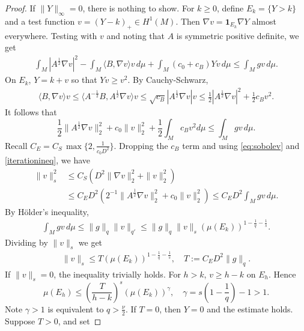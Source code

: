 \documentclass[11pt]{amsart}
\theoremstyle{definition}
\begin{document}
\begin{proof}
    If $\|Y\|_\infty=0$, there is nothing to show.  For $k\geq 0$, define $E_k=\{Y > k\}$ and a test function $v=(Y-k)_+\in H^1(M)$.  Then $\nabla v= \mathbf{1}_{E_k}\nabla Y$ almost everywhere.  Testing with $v$ and noting that $A$ is symmetric positive definite, we get
    \begin{align*}
        \int_M |A^{\frac{1}{2}}\nabla v|^2-\int_M\langle B,\nabla v\rangle v\,d\mu+\int_M(c_0+ c_B)Yv\,d\mu\leq \int_Mgv\,d\mu.
    \end{align*}
    On $E_k$, $Y=k+v$ so that $Yv\geq v^2$.  By Cauchy-Schwarz, 
    \begin{align*}
        \langle B,\nabla v\rangle v\leq \langle A^{-\frac{1}{2}}B,A^{\frac{1}{2}}\nabla v\rangle v\leq \sqrt{c_B}|A^{\frac{1}{2}}\nabla v|v\leq \frac{1}{2}|A^{\frac{1}{2}}\nabla v|^2+\frac{1}{2}c_Bv^2.
    \end{align*}
    It follows that
    \begin{equation}\label{iterationineq}
    \frac{1}{2}\|A^{\frac{1}{2}}\nabla v\|_2^2+c_0\|v\|_2^2+\frac{1}{2}\int_Mc_Bv^2d\mu\leq \int_Mgv\,d\mu.
    \end{equation}
    Recall $C_E=C_S\,\max\{2,\frac{1}{c_0D^2}\}$. Dropping the $c_B$ term and using \eqref{eq:sobolev} and \eqref{iterationineq}, we have
    \begin{align*}
        \|v\|_s^2&\leq C_S(D^2\|\nabla v\|_2^2+\|v\|_2^2)\\
        &\leq C_ED^2(2^{-1}\|A^{\frac{1}{2}}\nabla v\|_2^2+c_0\|v\|_2^2)\leq C_ED^2\int_Mgv\,d\mu.
    \end{align*}
    By H\"older's inequality,
    \begin{align*}
        \int_Mgv\,d\mu\leq\|g\|_q\|v\|_{q'}\leq\|g\|_q\|v\|_s(\mu(E_k))^{1-\frac{1}{q}-\frac{1}{s}}.
    \end{align*}
    Dividing by $\|v\|_s$ we get
    \begin{align*}
        \|v\|_s\leq T(\mu(E_k))^{1-\frac{1}{q}-\frac{1}{s}}, \quad T:=C_ED^2\|g\|_q.
    \end{align*}
    If $\|v\|_s=0$, the inequality trivially holds.
    For $h>k$, $v\geq h-k$ on $E_h$. Hence
    \begin{equation}\label{measureineq}
       \mu(E_h)\leq \left(\frac{T}{h-k}\right)^s(\mu(E_k))^\gamma, \quad \gamma=s\left(1-\frac{1}{q}\right)-1>1. 
    \end{equation}
    Note $\gamma>1$ is equivalent to $q>\frac{\nu}{2}$.
    If $T=0$, then $Y=0$ and the estimate holds.  Suppose $T>0$, and set

\end{proof}
\end{document}
